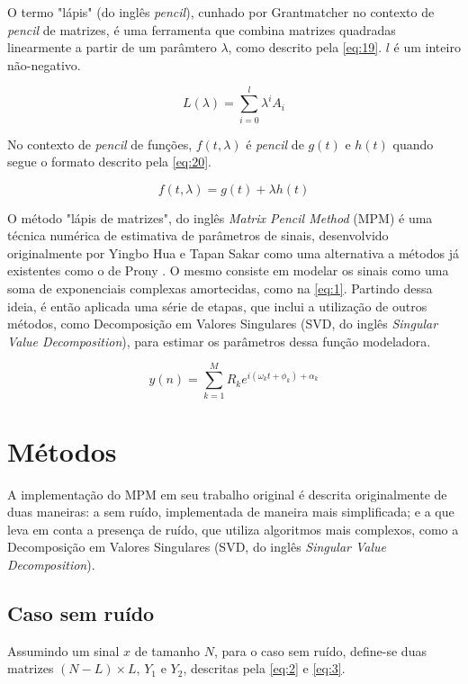 \documentclass[12pt]{article}
\begin{document}
O termo "lápis" (do inglês \textit{pencil}), cunhado por Grantmatcher \cite{} no contexto de \textit{pencil} de matrizes, é uma ferramenta que combina matrizes 
quadradas linearmente a partir de um parâmtero $\lambda$, como descrito pela \autoref{eq:19}. $l$ é um inteiro não-negativo.

\begin{equation} \label{eq:19}
    L(\lambda) = \sum_{i = 0}^{l} \lambda^i A_i
\end{equation}

No contexto de \textit{pencil} de funções, $f(t, \lambda)$ é \textit{pencil} de $g(t)$ e $h(t)$ quando segue o formato descrito pela \autoref{eq:20}.

\begin{equation} \label{eq:20}
    f(t, \lambda) = g(t) + \lambda h(t)
\end{equation}

O método "lápis de matrizes", do inglês \textit{Matrix Pencil Method} (MPM) é uma técnica numérica
de estimativa de parâmetros de sinais, desenvolvido originalmente por Yingbo Hua e Tapan Sakar \cite{370583} como uma alternativa a métodos já existentes 
como o de Prony \cite{49090}. O mesmo consiste em modelar os sinais como uma soma de exponenciais complexas amortecidas, como na \autoref{eq:1}. Partindo 
dessa ideia, é então aplicada uma série de etapas, que inclui a utilização de outros métodos, como Decomposição em Valores Singulares (SVD, do inglês \textit{Singular Value Decomposition}), 
para estimar os parâmetros dessa função modeladora.  

\begin{equation} \label{eq:1}
    y(n) = \sum_{k=1}^{M} R_k e^{i (\omega_k t + \phi_k) + \alpha_k }
\end{equation}

\section{Métodos}

A implementação do MPM em seu trabalho original é descrita originalmente de duas maneiras: a sem ruído, 
implementada de maneira mais simplificada; e a que leva em conta a presença de ruído, que utiliza algoritmos mais complexos, como a
Decomposição em Valores Singulares (SVD, do inglês \textit{Singular Value Decomposition}).

\subsection{Caso sem ruído}
Assumindo um sinal $x$ de tamanho $N$, para o caso sem ruído, define-se duas matrizes $(N-L) \times L$, $Y_1$ e $Y_2$, descritas pela \autoref{eq:2} e \autoref{eq:3}.
\end{document}

